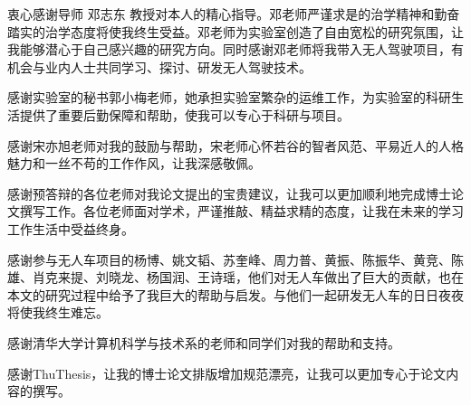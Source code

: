 \begin{acknowledgement}
  衷心感谢导师 邓志东 教授对本人的精心指导。邓老师严谨求是的治学精神和勤奋踏实的治学态度将使我终生受益。邓老师为实验室创造了自由宽松的研究氛围，让我能够潜心于自己感兴趣的研究方向。同时感谢邓老师将我带入无人驾驶项目，有机会与业内人士共同学习、探讨、研发无人驾驶技术。
  
  感谢实验室的秘书郭小梅老师，她承担实验室繁杂的运维工作，为实验室的科研生活提供了重要后勤保障和帮助，使我可以专心于科研与项目。
  
  感谢宋亦旭老师对我的鼓励与帮助，宋老师心怀若谷的智者风范、平易近人的人格魅力和一丝不苟的工作作风，让我深感敬佩。
  
  感谢预答辩的各位老师对我论文提出的宝贵建议，让我可以更加顺利地完成博士论文撰写工作。各位老师面对学术，严谨推敲、精益求精的态度，让我在未来的学习工作生活中受益终身。
  
  感谢参与无人车项目的杨博、姚文韬、苏奎峰、周力普、黄振、陈振华、黄竞、陈雄、肖克来提、刘晓龙、杨国润、王诗瑶，他们对无人车做出了巨大的贡献，也在本文的研究过程中给予了我巨大的帮助与启发。与他们一起研发无人车的日日夜夜将使我终生难忘。

  感谢清华大学计算机科学与技术系的老师和同学们对我的帮助和支持。
  
  感谢ThuThesis，让我的博士论文排版增加规范漂亮，让我可以更加专心于论文内容的撰写。
  
\end{acknowledgement}
